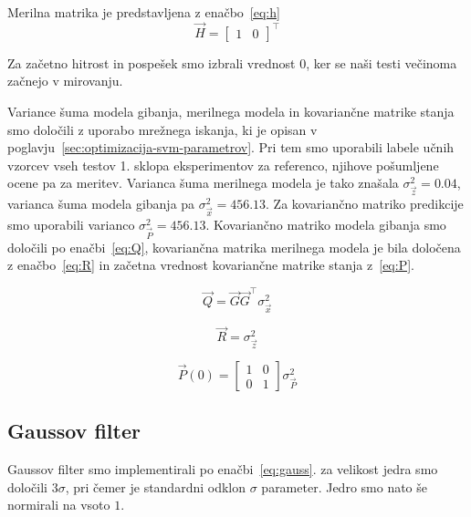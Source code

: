 Merilna matrika je predstavljena z enačbo~\eqref{eq:h}
\begin{equation}
\vec{H} = \begin{bmatrix}
				1 & 0
			\end{bmatrix}^\top 
            \label{eq:h}
\end{equation}

Za začetno hitrost in pospešek smo izbrali vrednost $0$, ker se naši testi večinoma začnejo v mirovanju. 

Variance šuma modela gibanja, merilnega modela in kovariančne matrike stanja smo določili z uporabo mrežnega iskanja, ki je opisan v poglavju~\ref{sec:optimizacija-svm-parametrov}. Pri tem smo uporabili labele učnih vzorcev vseh testov 1. sklopa eksperimentov za referenco, njihove pošumljene ocene pa za meritev. Varianca šuma merilnega modela je tako znašala $\sigma_\vec{z}^2 = \num{0.04}$, varianca šuma modela gibanja pa $\sigma_\vec{x}^2 = \num{456.13}$. Za kovariančno matriko predikcije smo uporabili varianco $\sigma_\vec{P}^2 = \num{456.13}$. Kovariančno matriko modela gibanja smo določili po enačbi~\eqref{eq:Q}, kovariančna matrika merilnega modela je bila določena z enačbo~\eqref{eq:R} in začetna vrednost kovariančne matrike stanja z~\eqref{eq:P}.

\begin{equation}
\vec{Q} = \vec{G} \vec{G}^\top \sigma_\vec{x}^2
\label{eq:Q}
\end{equation}

\begin{equation}
\vec{R} = \sigma_\vec{z}^2
\label{eq:R}
\end{equation}

\begin{equation}
\vec{P}(0) = \begin{bmatrix}
1 & 0 \\
0 & 1
\end{bmatrix} \sigma_\vec{P}^2
\label{eq:P}
\end{equation}










\subsection{Gaussov filter}\label{sec:implementacija-gauss}

Gaussov filter smo implementirali po enačbi~\eqref{eq:gauss}. za velikost jedra smo določili $3\sigma$, pri čemer je standardni odklon $\sigma$ parameter. Jedro smo nato še normirali na vsoto $1$. 

